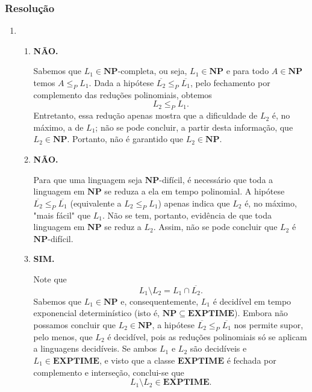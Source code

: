 \documentclass[a4paper,12pt]{article}
\begin{document}
\subsubsection*{Resolução}
\begin{enumerate}[label=\alph*)]
  \item
  \begin{enumerate}[label=(\roman*)]
    \item \textbf{NÃO.}

    \vspace{0.3cm}
    Sabemos que $L_1 \in \mathbf{NP}\text{-completa}$, ou seja, $L_1 \in \mathbf{NP}$ e para todo $A \in \mathbf{NP}$ temos $A \leq_P L_1$.  
    Dada a hipótese $\overline{L_2} \leq_P \overline{L_1}$, pelo fechamento por complemento das reduções polinomiais, obtemos 
    $$L_2 \leq_P L_1.$$ 
    Entretanto, essa redução apenas mostra que a dificuldade de $L_2$ é, no máximo, a de $L_1$; não se pode concluir, a partir desta informação, que $L_2 \in \mathbf{NP}$.  
    Portanto, não é garantido que $L_2 \in \mathbf{NP}$.

    \vspace{0.5cm}
    \item \textbf{NÃO.}

    \vspace{0.3cm}
    Para que uma linguagem seja $\mathbf{NP}\text{-difícil}$, é necessário que toda a linguagem em $\mathbf{NP}$ se reduza a ela em tempo polinomial.  
    A hipótese $\overline{L_2} \leq_P \overline{L_1}$ (equivalente a $L_2 \leq_P L_1$) apenas indica que $L_2$ é, no máximo, "mais fácil" que $L_1$.  
    Não se tem, portanto, evidência de que toda linguagem em $\mathbf{NP}$ se reduz a $L_2$.  
    Assim, não se pode concluir que $L_2$ é $\mathbf{NP}$-difícil.

    \vspace{0.5cm}
    \item \textbf{SIM.}

    \vspace{0.3cm}
    Note que
    $$L_1 \setminus L_2 = L_1 \cap \overline{L_2}.$$
    Sabemos que $L_1 \in \mathbf{NP}$ e, consequentemente, $L_1$ é decidível em tempo exponencial determinístico (isto é, $\mathbf{NP} \subseteq \mathbf{EXPTIME}$).  
    Embora não possamos concluir que $L_2 \in \mathbf{NP}$, a hipótese $\overline{L_2} \leq_P \overline{L_1}$ nos permite supor, pelo menos, que $L_2$ é decidível, pois as reduções polinomiais só se aplicam a linguagens decidíveis.  
    Se ambos $L_1$ e $L_2$ são decidíveis e $L_1 \in \mathbf{EXPTIME}$, e visto que a classe $\mathbf{EXPTIME}$ é fechada por complemento e interseção, conclui-se que
    $$L_1 \setminus L_2 \in \mathbf{EXPTIME}.$$
  \end{enumerate}
\end{enumerate}
\end{document}
